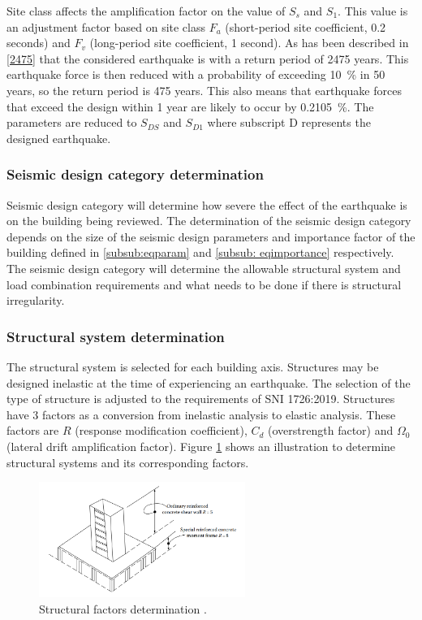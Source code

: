 \documentclass{cup-pan}
\begin{document}
Site class affects the amplification factor on the value of $S_s$ and $S_1$. This value is an adjustment factor based on site class $F_a$ (short-period site coefficient, 0.2 seconds) and $F_v$ (long-period site coefficient, 1 second). As has been described in \ref{2475} that the considered earthquake is with a return period of 2475 years. This earthquake force is then reduced with a probability of exceeding \SI{10}{\percent} in 50 years, so the return period is 475 years. This also means that earthquake forces that exceed the design within 1 year are likely to occur by \SI{0.2105}{\percent}. The parameters are reduced to $S_{DS}$ and $S_{D1}$ where subscript D represents the designed earthquake.

\subsubsection{Seismic design category determination}
Seismic design category will determine how severe the effect of the earthquake is on the building being reviewed. The determination of the seismic design category depends on the size of the seismic design parameters and importance factor of the building defined in \ref{subsub:eqparam} and \ref{subsub: eqimportance} respectively. The seismic design category will determine the allowable structural system and load combination requirements and what needs to be done if there is structural irregularity.

\subsubsection{Structural system determination}
The structural system is selected for each building axis. Structures may be designed inelastic at the time of experiencing an earthquake. The selection of the type of structure is adjusted to the requirements of SNI 1726:2019. Structures have 3 factors as a conversion from inelastic analysis to elastic analysis. These factors are $R$ (response modification coefficient), $C_d$ (overstrength factor) and $\Omega_0$ (lateral drift amplification factor). Figure \ref{fig:structural factors} shows an illustration to determine structural systems and its corresponding factors.

\begin{figure}[H]
\centering
\includegraphics[width=0.6\textwidth]{fig3.png}
\caption{Structural factors determination \citep{taranath}.}
\label{fig:structural factors}
\end{figure}
\end{document}
